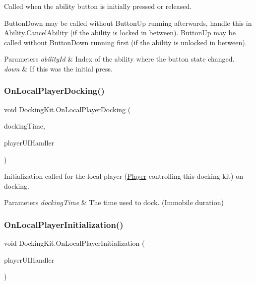 Called when the ability button is initially pressed or released. 

Button\+Down may be called without Button\+Up running afterwards, handle this in \hyperlink{class_ability_ab0eaf1ad670e0624a5534c50b10c002f}{Ability.\+Cancel\+Ability} (if the ability is locked in between). Button\+Up may be called without Button\+Down running first (if the ability is unlocked in between). 


\begin{DoxyParams}{Parameters}
{\em ability\+Id} & Index of the ability where the button state changed.\\
\hline
{\em down} & If this was the initial press.\\
\hline
\end{DoxyParams}
\hypertarget{class_docking_kit_a30aaa34339d35b52a59af9a871fa0182}{}\label{class_docking_kit_a30aaa34339d35b52a59af9a871fa0182} 
\subsubsection{\texorpdfstring{On\+Local\+Player\+Docking()}{OnLocalPlayerDocking()}}
{\footnotesize\ttfamily void Docking\+Kit.\+On\+Local\+Player\+Docking (\begin{DoxyParamCaption}\item[{float}]{docking\+Time,  }\item[{\hyperlink{class_player_u_i_handler}{Player\+U\+I\+Handler}}]{player\+U\+I\+Handler }\end{DoxyParamCaption})}



Initialization called for the local player (\hyperlink{class_player}{Player} controlling this docking kit) on docking. 


\begin{DoxyParams}{Parameters}
{\em docking\+Time} & The time used to dock. (Immobile duration)\\
\hline
\end{DoxyParams}
\hypertarget{class_docking_kit_a1498b50f1fe0b8e54e69c637306c61b6}{}\label{class_docking_kit_a1498b50f1fe0b8e54e69c637306c61b6} 
\subsubsection{\texorpdfstring{On\+Local\+Player\+Initialization()}{OnLocalPlayerInitialization()}}
{\footnotesize\ttfamily void Docking\+Kit.\+On\+Local\+Player\+Initialization (\begin{DoxyParamCaption}\item[{\hyperlink{class_player_u_i_handler}{Player\+U\+I\+Handler}}]{player\+U\+I\+Handler }\end{DoxyParamCaption})}



